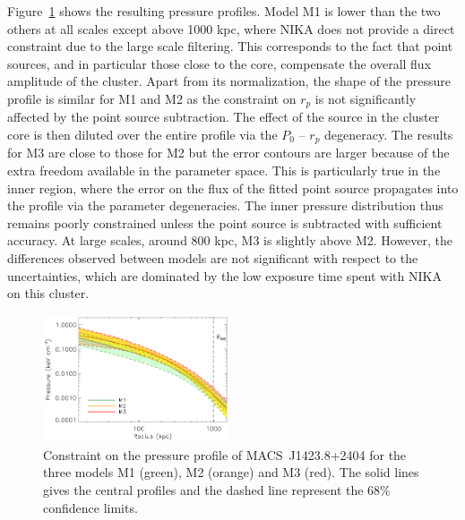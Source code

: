 \documentclass[twocolumn,traditabstract]{aa}
\begin{document}
Figure~\ref{fig:MACSJ1424_pressure_point_source} shows the resulting pressure profiles. Model M1 is lower than the two others at all scales except above 1000 kpc, where NIKA does not provide a direct constraint due to the large scale filtering. This corresponds to the fact that point sources, and in particular those close to the core, compensate the overall flux amplitude of the cluster. Apart from its normalization, the shape of the pressure profile is similar for M1 and M2 as the constraint on $r_p$ is not significantly affected by the point source subtraction. The effect of the source in the cluster core is then diluted over the entire  profile via the $P_0$ -- $r_p$ degeneracy. The results for M3 are close to those for M2 but the error contours are larger because of the extra freedom available in the parameter space. This is particularly true in the inner region, where the error on the flux of the fitted point source propagates into the profile via the parameter degeneracies. The inner pressure distribution thus remains poorly constrained unless the point source is subtracted with sufficient accuracy. At large scales, around 800 kpc,  M3 is slightly above M2. However, the differences observed between models are not significant with respect to the uncertainties, which are dominated by the low exposure time spent with NIKA on this cluster.
\begin{figure}[h]
\centering
\includegraphics[width=0.49\textwidth]{Figure/ICM_pressure_profile_point_sources.pdf}
\caption{\footnotesize Constraint on the pressure profile of \mbox{MACS~J1423.8+2404} for the three models M1 (green), M2 (orange) and M3 (red). The solid lines gives the central profiles and the dashed line represent the 68\% confidence limits.}
\label{fig:MACSJ1424_pressure_point_source}
\end{figure}
\end{document}
